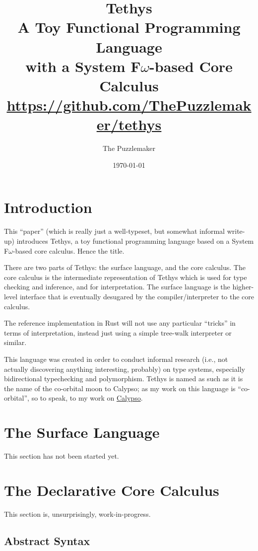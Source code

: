 \documentclass[11pt]{article}
\title{Tethys\\
    \large A Toy Functional Programming Language\\
    with a System F$\omega$-based Core Calculus\\
    \url{https://github.com/ThePuzzlemaker/tethys}}
\author{The Puzzlemaker}
\date{\today}
\begin{document}
\maketitle

\tableofcontents
\newpage

\section{Introduction}

This ``paper'' (which is really just a well-typeset, but somewhat informal write-up) introduces Tethys, a toy functional programming language based on a System F$\omega$-based core calculus. Hence the title.

There are two parts of Tethys: the surface language, and the core calculus. The core calculus is the intermediate representation of Tethys which is used for type checking and inference, and for interpretation. The surface language is the higher-level interface that is eventually desugared by the compiler/interpreter to the core calculus.

The reference implementation in Rust will not use any particular ``tricks'' in terms of interpretation, instead just using a simple tree-walk interpreter or similar.

This language was created in order to conduct informal research (i.e., not actually discovering anything interesting, probably) on type systems, especially bidirectional typechecking and polymorphism. Tethys is named as such as it is the name of the co-orbital moon to Calypso; as my work on this language is ``co-orbital'', so to speak, to my work on \href{https://calypso-lang.github.io}{Calypso}.

\section{The Surface Language}

This section has not been started yet.

\section{The Declarative Core Calculus}

This section is, unsurprisingly, work-in-progress.

\subsection{Abstract Syntax}
\end{document}
